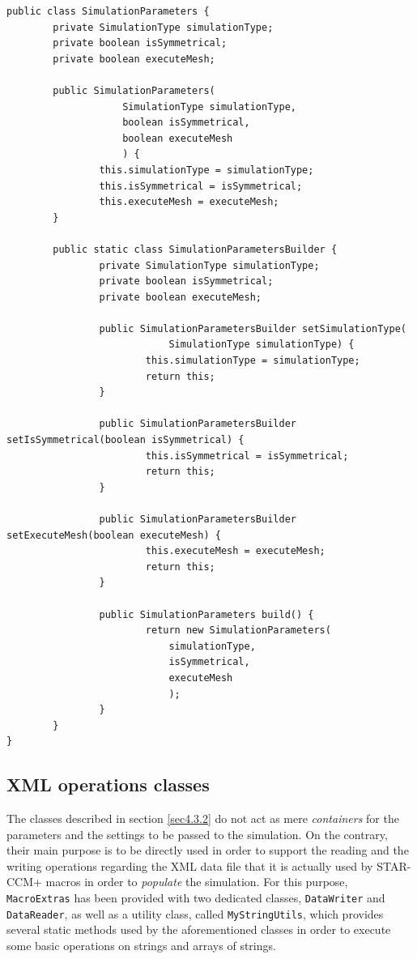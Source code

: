 \begin{lstlisting}[caption={\lstinline!SimulationParameters! class overview}, captionpos=b, tabsize=2, label={lst:SimulationParameters}]	
public class SimulationParameters {
		private SimulationType simulationType;
		private boolean isSymmetrical;
		private boolean executeMesh;
	
		public SimulationParameters(
					SimulationType simulationType,
					boolean isSymmetrical,
					boolean executeMesh
					) {
				this.simulationType = simulationType;
				this.isSymmetrical = isSymmetrical;
				this.executeMesh = executeMesh;
		}

		public static class SimulationParametersBuilder {
				private SimulationType simulationType;
				private boolean isSymmetrical;
				private boolean executeMesh;
		
				public SimulationParametersBuilder setSimulationType(
							SimulationType simulationType) {
						this.simulationType = simulationType;
						return this;
				}
		
				public SimulationParametersBuilder setIsSymmetrical(boolean isSymmetrical) {
						this.isSymmetrical = isSymmetrical;
						return this;
				}
		
				public SimulationParametersBuilder setExecuteMesh(boolean executeMesh) {
						this.executeMesh = executeMesh;
						return this;
				}
		
				public SimulationParameters build() {
						return new SimulationParameters(
							simulationType,
							isSymmetrical,
							executeMesh
							);
				}
		}
}
\end{lstlisting}

\subsection{XML operations classes}
\label{sec4.3.3}

The classes described in section \ref{sec4.3.2} do not act as mere \emph{containers} for the parameters and the settings to be passed to the simulation. On the contrary, their main purpose is to be directly used in order to support the reading and the writing operations regarding the XML data file that it is actually used by STAR-CCM+ macros in order to \emph{populate} the simulation. For this purpose, \lstinline[language=Java]!MacroExtras! has been provided with two dedicated classes, \lstinline[language=Java]!DataWriter! and \lstinline[language=Java]!DataReader!, as well as a utility class, called \lstinline[language=Java]!MyStringUtils!, which provides several static methods used by the aforementioned classes in order to execute some basic operations on strings and arrays of strings.


